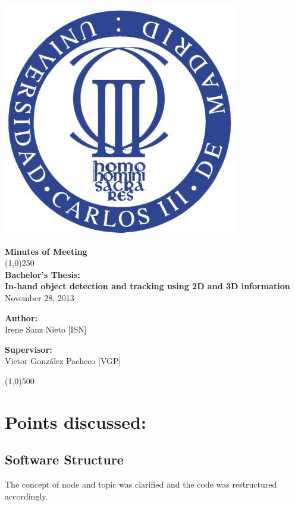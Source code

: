 \documentclass{article}
\newenvironment{myindentpar}[1]%
 {\begin{list}{}%
         {\setlength{\leftmargin}{#1}}%
         \item[]%
 }
 {\end{list}}
\begin{document}
\includegraphics[width=0.1\linewidth]{../template/uc3m.jpg}

\vspace{-1cm}
\begin{minipage}[b]{1\linewidth}
	\begin{center}
	{\Huge \bfseries{Minutes of Meeting}}\\
	\line(1,0){250}\\[0.5cm]
	{\LARGE \textbf{Bachelor's Thesis:\\[0.5cm] In-hand object detection and tracking using 2D and 3D information}}\\[0.5cm]
	{\large November 28, 2013 }
	\end{center}
\end {minipage}



\begin{minipage}{0.55\textwidth}
\begin{flushleft} \large
\textbf{{Author:}\\}
Irene Sanz Nieto [ISN]\\
\end{flushleft}
\end{minipage}
\begin{minipage}{0.4\textwidth}
\begin{flushright} \large
\textbf{Supervisor: }\\
Victor González Pacheco [VGP]
\end{flushright}\end{minipage}

\begin{center}
\line(1,0){500}
\end{center}

\renewcommand{\thesubsection}
{\hspace*{1cm} \arabic{section}.\arabic{subsection}}



\section{\LARGE Points discussed: }

	\subsection{Software Structure}
	\begin{myindentpar}{1cm} 
		The concept of node and topic was clarified and the code was restructured accordingly. 
	\end{myindentpar}
\end{document}
